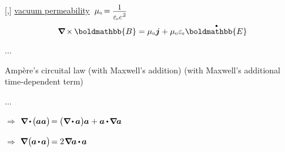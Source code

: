 [,] \href{https://en.wikipedia.org/wiki/Vacuum_permeability}{vacuum permeability}~${\vacuumpermeability \hspace{-0.24ex} = \hspace{-0.08ex} \smash{\scalebox{0.9}{$\displaystyle \frac{\raisemath{-0.16em}{1}}{\raisemath{-0.1em}{\vacuumpermittivity \hspace{.1ex} c^{\hspace{.16ex}2}}}$}}}$

\nopagebreak\vspace{-0.1em}\begin{equation*}
\boldnabla \hspace{-0.15ex} \times \hspace{-0.1ex} \boldmathbb{B} = \vacuumpermeability \hspace{.1ex} \bm{j} + \vacuumpermeability \hspace{.1ex} \vacuumpermittivity \hspace{.1ex} \mathdotabove{\boldmathbb{E}}
\end{equation*}

...

Ampère’s circuital law (with Maxwell’s addition) (with Maxwell’s additional time-dependent term)

...

$\Rightarrow$
${
\boldnabla \hspace{-0.16ex} \dotp \hspace{-0.2ex} \bigl( \hspace{-0.05ex} \bm{a} \bm{a} \bigr) \hspace{-0.33ex}
= \hspace{-0.1ex} \bigl( \boldnabla \hspace{-0.18ex} \dotp \hspace{-0.1ex} \bm{a} \bigr) \hspace{-0.1ex} \bm{a} \hspace{.1ex} + \bm{a} \hspace{-0.07ex} \dotp \hspace{-0.2ex} \boldnabla \hspace{-0.1ex} \bm{a}
}$

$\Rightarrow$
${
\boldnabla \hspace{.1ex} \bigl( \hspace{-0.1ex} \bm{a} \hspace{-0.17ex} \dotp \hspace{-0.2ex} \bm{a} \bigr) \hspace{-0.33ex}
= 2 \hspace{.16ex} \boldnabla \hspace{-0.1ex} \bm{a} \hspace{-0.12ex} \dotp \hspace{-0.15ex} \bm{a}
}$

